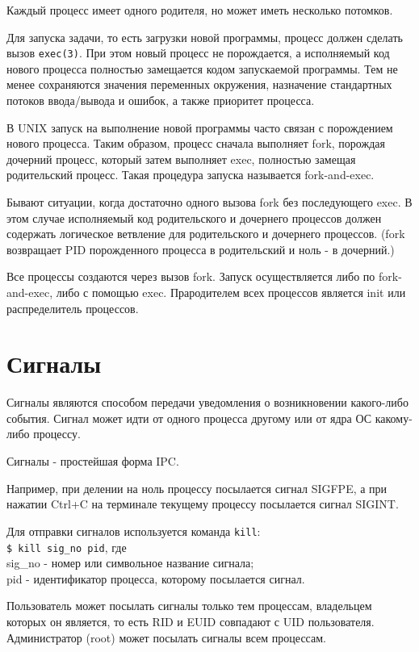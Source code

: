 Каждый процесс имеет одного родителя, но может иметь несколько потомков.

Для запуска задачи, то есть загрузки новой программы, процесс должен сделать вызов \verb+exec(3)+. При этом новый процесс не порождается, а исполняемый код нового процесса полностью замещается кодом запускаемой программы. Тем не менее сохраняются значения переменных окружения, назначение стандартных потоков ввода/вывода и ошибок, а также приоритет процесса.

В UNIX запуск на выполнение новой программы часто связан с порождением нового процесса. Таким образом, процесс сначала выполняет fork, порождая дочерний процесс, который затем выполняет exec, полностью замещая родительский процесс. Такая процедура запуска называется fork-and-exec. 

Бывают ситуации, когда достаточно одного вызова fork без последующего exec. В этом случае исполняемый код родительского и дочернего процессов должен содержать логическое ветвление для родительского и дочернего процессов. (fork возвращает PID порожденного процесса в родительский и ноль - в дочерний.)

Все процессы создаются через вызов fork. Запуск осуществляется либо по fork-and-exec, либо с помощью exec.
Прародителем всех процессов является init или распределитель процессов.


\section{Сигналы}

Сигналы являются способом передачи уведомления о возникновении какого-либо события. Сигнал может идти от одного процесса другому или от ядра ОС какому-либо процессу.
 
Сигналы - простейшая форма IPC. 

Например, при делении на ноль процессу посылается сигнал SIGFPE, а при нажатии Ctrl+C на терминале текущему процессу посылается сигнал SIGINT.

Для отправки сигналов используется команда \verb+kill+: \\
\verb+$ kill sig_no pid+, где \\
sig\_no - номер или символьное название сигнала;\\
pid - идентификатор процесса, которому посылается сигнал.

Пользователь может посылать сигналы только тем процессам, владельцем которых он является, то есть RID и EUID совпадают с UID пользователя. Администратор (root) может посылать сигналы всем процессам.

